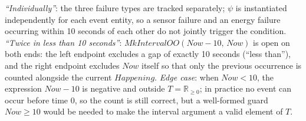 \textit{``Individually''}: the three failure types are tracked separately; $\psi$ is instantiated independently for each event entity, so a sensor failure and an energy failure occurring within 10 seconds of each other do not jointly trigger the condition.
\textit{``Twice in less than 10 seconds''}: $\mathit{MkIntervalOO}(\mathit{Now} - 10,\, \mathit{Now})$ is open on both ends: the left endpoint excludes a gap of exactly 10 seconds (``less than''), and the right endpoint excludes $\mathit{Now}$ itself so that only the previous occurrence is counted alongside the current $\mathit{Happening}$.
\textit{Edge case}: when $\mathit{Now} < 10$, the expression $\mathit{Now} - 10$ is negative and outside $T = \mathbb{R}_{\geq 0}$; in practice no event can occur before time 0, so the count is still correct, but a well-formed guard $\mathit{Now} \geq 10$ would be needed to make the interval argument a valid element of $T$.
